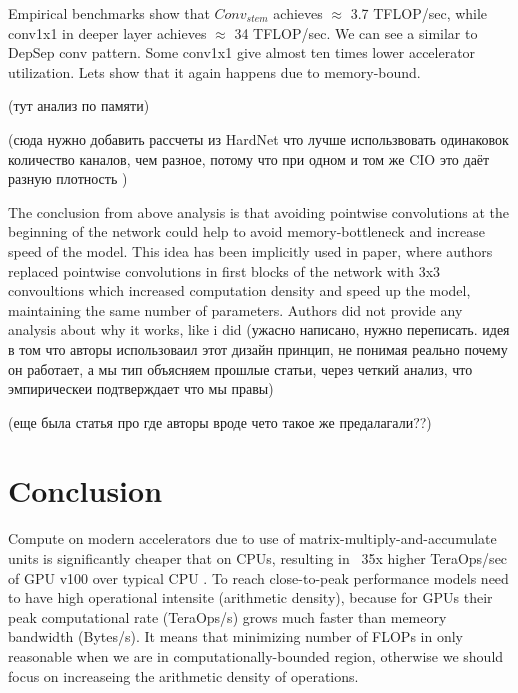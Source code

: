 %

Empirical benchmarks show that $Conv_{stem}$ achieves $\approx$ 3.7 TFLOP/sec, while conv1x1 in deeper layer achieves $\approx$ 34 TFLOP/sec. We can see a similar to DepSep conv pattern. Some conv1x1 give almost ten times lower accelerator utilization. Lets show that it again happens due to memory-bound.

(тут анализ по памяти)

(сюда нужно добавить рассчеты из HardNet что лучше использвовать одинаковок количество каналов, чем разное, потому что при одном и том же CIO это даёт разную плотность )

The conclusion from above analysis is that avoiding pointwise convolutions at the beginning of the network could help to avoid memory-bottleneck and increase speed of the model. This idea has been implicitly used in \cite{ridnik2021_tresnet} paper, where authors replaced pointwise convolutions in first blocks of the network with 3x3 convoultions which increased computation density and speed up the model, maintaining the same number of parameters. Authors did not provide any analysis about why it works, like i did (ужасно написано, нужно переписать. идея в том что авторы использоваил этот дизайн принцип, не понимая реально почему он работает, а мы тип объясняем прошлые статьи, через четкий анализ, что эмпирическеи подтверждает что мы правы)


(еще была статья про \cite{zhou2020_rethinking} где авторы вроде чето такое же предалагали??)

\section{Conclusion} \label{subsec: speed_conclusion}

Compute on modern accelerators due to use of matrix-multiply-and-accumulate units is significantly cheaper that on CPUs, resulting in ~35x higher TeraOps/sec of GPU v100 over typical CPU \cite{li2021_searching}. To reach close-to-peak performance models need to have high operational intensite (arithmetic density), because for GPUs their peak computational rate (TeraOps/s) grows much faster than memeory bandwidth (Bytes/s). It means that minimizing number of FLOPs in only reasonable when we are in computationally-bounded region, otherwise we should focus on increaseing the arithmetic density of operations.  



